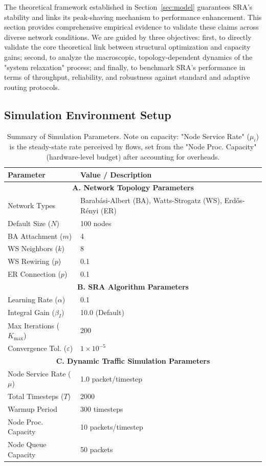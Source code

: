 \documentclass[journal]{IEEEtran}
\begin{document}
The theoretical framework established in Section~\ref{sec:model} guarantees SRA's stability and links its peak-shaving mechanism to performance enhancement. This section provides comprehensive empirical evidence to validate these claims across diverse network conditions. We are guided by three objectives: first, to directly validate the core theoretical link between structural optimization and capacity gains; second, to analyze the macroscopic, topology-dependent dynamics of the "system relaxation" process; and finally, to benchmark SRA's performance in terms of throughput, reliability, and robustness against standard and adaptive routing protocols.

\subsection{Simulation Environment Setup}
\label{subsec:sim_setup}
\begin{table}[h!]
\centering
\caption{Summary of Simulation Parameters. Note on capacity: "Node Service Rate" ($\mu_i$) is the steady-state rate perceived by flows, set from the "Node Proc. Capacity" (hardware-level budget) after accounting for overheads.}
\label{tab:sim_params}
\renewcommand{\arraystretch}{1.2}
\small
\begin{tabularx}{\columnwidth}{|l|X|}
\hline
\textbf{Parameter} & \textbf{Value / Description} \\
\hline
\hline
\multicolumn{2}{|c|}{\textbf{A. Network Topology Parameters}} \\
\hline
Network Types & Barabási-Albert (BA), Watts-Strogatz (WS), Erd\H{o}s-Rényi (ER) \\
\hline
Default Size ($N$) & 100 nodes \\
\hline
BA Attachment ($m$) & 4 \\
\hline
WS Neighbors ($k$) & 8 \\
\hline
WS Rewiring ($p$) & 0.1 \\
\hline
ER Connection ($p$) & 0.1 \\
\hline
\hline
\multicolumn{2}{|c|}{\textbf{B. SRA Algorithm Parameters}} \\
\hline
Learning Rate ($\alpha$) & 0.1 \\
\hline
Integral Gain ($\beta_I$) & 10.0 (Default) \\
\hline
Max Iterations ($K_{\max}$) & 200 \\
\hline
Convergence Tol. ($\varepsilon$) & $1 \times 10^{-5}$ \\
\hline
\hline
\multicolumn{2}{|c|}{\textbf{C. Dynamic Traffic Simulation Parameters}} \\
\hline
Node Service Rate ($\mu$) & 1.0 packet/timestep \\
\hline
Total Timesteps ($T$) & 2000 \\
\hline
Warmup Period & 300 timesteps \\
\hline
Node Proc. Capacity & 10 packets/timestep \\
\hline
Node Queue Capacity & 50 packets \\
\hline
\end{tabularx}
\end{table}
\end{document}

